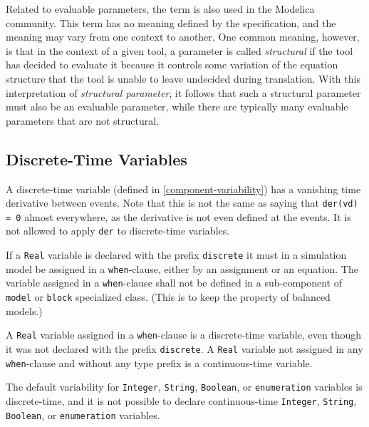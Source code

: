\begin{nonnormative}
Related to evaluable parameters, the term  is also used in the Modelica community.
This term has no meaning defined by the specification, and the meaning may vary from one context to another.
One common meaning, however, is that in the context of a given tool, a parameter is called \emph{structural} if the tool has decided to evaluate it because it controls some variation of the equation structure that the tool is unable to leave undecided during translation.
With this interpretation of \emph{structural parameter}, it follows that such a structural parameter must also be an evaluable parameter, while there are typically many evaluable parameters that are not structural.
\end{nonnormative}


\subsection{Discrete-Time Variables}\label{discrete-time-variables}

A discrete-time variable (defined in \cref{component-variability}) has a vanishing time derivative between events.
Note that this is not the same as saying that \lstinline!der(vd) = 0! almost everywhere, as the derivative is not even defined at the events.
It is not allowed to apply \lstinline!der! to discrete-time variables.

If a \lstinline!Real! variable is declared with the prefix \lstinline!discrete! it must in a simulation model be assigned in a \lstinline!when!-clause, either by an assignment or an equation.
The variable assigned in a \lstinline!when!-clause shall not be defined in a sub-component of \lstinline!model! or \lstinline!block! specialized class.
(This is to keep the property of balanced models.)

A \lstinline!Real! variable assigned in a \lstinline!when!-clause is a discrete-time variable, even though it was not declared with the prefix \lstinline!discrete!. A \lstinline!Real! variable not assigned in any \lstinline!when!-clause and without any type prefix is a continuous-time variable.

The default variability for \lstinline!Integer!, \lstinline!String!, \lstinline!Boolean!, or \lstinline!enumeration! variables is discrete-time, and it is not possible to declare continuous-time \lstinline!Integer!, \lstinline!String!, \lstinline!Boolean!, or \lstinline!enumeration! variables.


